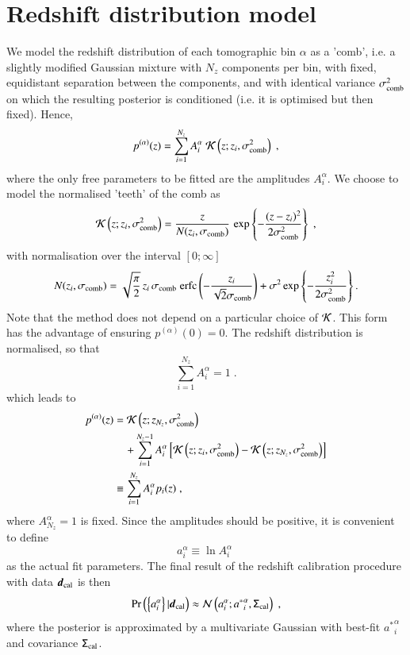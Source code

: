 \documentclass{aa}
\newcommand{\eq}[1]{\begin{equation}  #1 \end{equation}}
\newcommand{\eqa}[1]{\begin{align}   #1 \end{align}}
\newcommand{\br}[1]{\left( #1 \right)}
\newcommand{\bc}[1]{\left\{ #1 \right\}}
\newcommand{\bb}[1]{\left[ #1 \right]}
\newcommand{\nn}{\nonumber}
\newcommand{\pr}{{\rm Pr}}
\begin{document}
\section{Redshift distribution model}
\label{sec:comb}
We model the redshift distribution of each tomographic bin $\alpha$ as a 'comb', i.e. a slightly modified Gaussian mixture with $N_z$ components per bin, with fixed, equidistant separation between the components, and with identical variance $\sigma_{\rm comb}^2$ on which the resulting posterior is conditioned (i.e. it is optimised but then fixed). Hence,
\eq{
p^{(\alpha)}(z) = \sum_{i=1}^{N_z} A_i^\alpha\; {\cal K}\br{z; z_i, \sigma_{\rm comb}^2}\;,
}
where the only free parameters to be fitted are the amplitudes $A_i^\alpha$. We choose to model the normalised 'teeth' of the comb as
\eq{
{\cal K} \br{z; z_i, \sigma_{\rm comb}^2} = \frac{z}{N(z_i, \sigma_{\rm comb})}\, \exp \bc{- \frac{(z-z_i)^2}{2 \sigma_{\rm comb}^2} }\;, 
}
with normalisation over the interval $\bb{0;\infty}$
\eq{
N(z_i, \sigma_{\rm comb}) = \sqrt{\frac{\pi}{2}}\, z_i\, \sigma_{\rm comb}\; {\rm erfc} \br{-\frac{z_i}{\sqrt{2} \sigma_{\rm comb}}} + \sigma^2 \exp \bc{-\frac{z_i^2}{2 \sigma_{\rm comb}^2}}.
}
Note that the method does not depend on a particular choice of ${\cal K}$. This form has the advantage of ensuring $p^{(\alpha)}(0)=0$. The redshift distribution is normalised, so that
\eq{
\sum_{i=1}^{N_z} A_i^\alpha = 1\;.
}
which leads to
\eqa{
p^{(\alpha)}(z) &= {\cal K}\br{z; z_{N_z}, \sigma_{\rm comb}^2} \\ \nn
& ~~~~+ \sum_{i=1}^{N_z-1} A_i^\alpha \bb{ {\cal K}\br{z; z_i, \sigma_{\rm comb}^2}  - {\cal K}\br{z; z_{N_z}, \sigma_{\rm comb}^2} } \\ \nn
&\equiv \sum_{i=1}^{N_z} A_i^\alpha p_i(z)\;,
}
where $A_{N_z}^\alpha =1$ is fixed. Since the amplitudes should be positive, it is convenient to define
\eq{
a_i^\alpha \equiv \ln A_i^\alpha\;
}
as the actual fit parameters. The final result of the redshift calibration procedure with data $\boldsymbol{d}_{\rm cal}$ is then
\eq{
\pr \br{ \bc{a_i^\alpha} | \boldsymbol{d}_{\rm cal}} \approx {\cal N}\br{ a_i^\alpha; {a^*}_i^\alpha, \tens{\Sigma}_{\rm cal}}\;,
}
where the posterior is approximated by a multivariate Gaussian with best-fit ${a^*}_i^\alpha$ and covariance $\mathsf{\Sigma}_{\rm cal}$.

\end{document}
